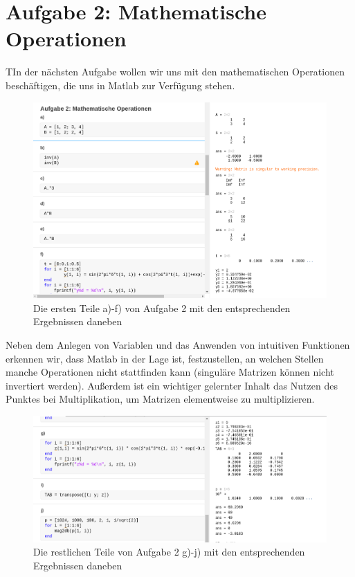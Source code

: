 \documentclass{article}
\begin{document}
\section{Aufgabe 2: Mathematische Operationen}

\begin{task}
  TIn der nächsten Aufgabe wollen wir uns mit den mathematischen Operationen beschäftigen, die uns in Matlab zur Verfügung stehen.
\end{task}

\begin{figure}[h]
  \centering
  \includegraphics[width=\textwidth]{../assets/images/ET2P6/aufgaben2a_f.png}
  \caption{Die ersten Teile a)-f) von Aufgabe 2 mit den entsprechenden Ergebnissen daneben}
  \label{fig:auf2af}
\end{figure}

Neben dem Anlegen von Variablen und das Anwenden von intuitiven Funktionen erkennen wir, dass Matlab in der Lage ist, festzustellen, an welchen Stellen manche Operationen nicht stattfinden kann (singuläre Matrizen können nicht invertiert werden). Außerdem ist ein wichtiger gelernter Inhalt das Nutzen des Punktes bei Multiplikation, um Matrizen elementweise zu multiplizieren.

\begin{figure}[h]
  \centering
  \includegraphics[width=\textwidth]{../assets/images/ET2P6/aufgaben2g_j.png}
  \caption{Die restlichen Teile von Aufgabe 2 g)-j) mit den entsprechenden Ergebnissen daneben}
  \label{fig:auf2gj}
\end{figure}
\end{document}
